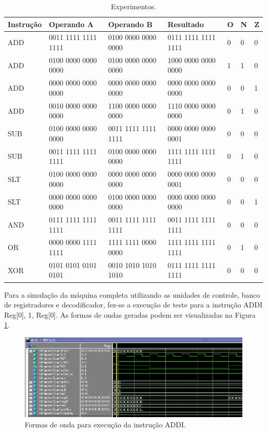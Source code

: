 \documentclass[11pt,a4paper,titlepage]{article}
\begin{document}
\begin{table}[t]
\centering
\begin{tabular}{|l|l|l|l|l|l|l|}
\hline
Instrução & Operando A & Operando B & Resultado & O & N & Z \\
\hline
ADD & 0011 1111 1111 1111 & 0100 0000 0000 0000 & 0111 1111 1111 1111 & 0 & 0 & 0 \\
ADD & 0100 0000 0000 0000 & 0100 0000 0000 0000 & 1000 0000 0000 0000 & 1 & 1 & 0 \\
ADD & 0000 0000 0000 0000 & 0000 0000 0000 0000 & 0000 0000 0000 0000 & 0 & 0 & 1 \\
ADD & 0010 0000 0000 0000 & 1100 0000 0000 0000 & 1110 0000 0000 0000 & 0 & 1 & 0 \\
SUB & 0100 0000 0000 0000 & 0011 1111 1111 1111 & 0000 0000 0000 0001 & 0 & 0 & 0 \\
SUB & 0011 1111 1111 1111 & 0100 0000 0000 0000 & 1111 1111 1111 1111 & 0 & 1 & 0 \\
SLT & 0100 0000 0000 0000 & 0000 0000 0000 0000 & 0000 0000 0000 0001 & 0 & 0 & 0 \\
SLT & 0000 0000 0000 0000 & 0100 0000 0000 0000 & 0000 0000 0000 0000 & 0 & 0 & 1 \\
AND & 0111 1111 1111 1111 & 0011 1111 1111 1111 & 0011 1111 1111 1111 & 0 & 0 & 0 \\
OR  & 0000 0000 1111 1111 & 1111 1111 0000 0000 & 1111 1111 1111 1111 & 0 & 1 & 0 \\
XOR & 0101 0101 0101 0101 & 0010 1010 1010 1010 & 0111 1111 1111 1111 & 0 & 0 & 0 \\
\hline
\end{tabular}
\caption{Experimentos.}
\label{tab:experiments}
\end{table}
%

Para a simulação da máquina completa utilizando as unidades de controle, banco de registradores e decodificador, fez-se a execução de teste para a instrução ADDI Reg[0], 1, Reg[0]. As formas de ondas geradas podem ser visualizadas na Figura \ref{fig:modelsim}.

\begin{figure}[h]
\centering
\includegraphics[scale=0.5]{images/ADDI_Sim.png}
\caption{Formas de onda para execução da instrução ADDI.}
\label{fig:modelsim}
\end{figure}
\end{document}
